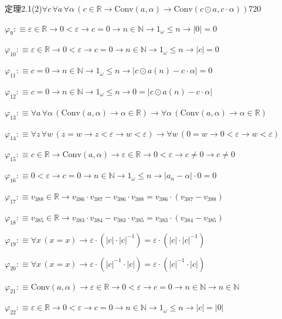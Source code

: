 \begin{fullproof}{定理2.1(2)}{$\forall c\,\forall a\,\forall \alpha\,(c \in \mathbb{R} \to \mathrm{Conv}(a,\alpha) \to \mathrm{Conv}(c \odot a,c \cdot \alpha))$}{720}
\begin{abbrevlist}
\item $\varphi_{9} :\equiv \varepsilon \in \mathbb{R} \to 0 < \varepsilon \to c = 0 \to n \in \mathbb{N} \to 1_{\omega} \leq n \to \lvert 0 \rvert = 0$
\item $\varphi_{10} :\equiv \varepsilon \in \mathbb{R} \to 0 < \varepsilon \to c = 0 \to n \in \mathbb{N} \to 1_{\omega} \leq n \to \lvert c \rvert = 0$
\item $\varphi_{11} :\equiv c = 0 \to n \in \mathbb{N} \to 1_{\omega} \leq n \to \lvert c \odot a(n) - c \cdot \alpha \rvert = 0$
\item $\varphi_{12} :\equiv c = 0 \to n \in \mathbb{N} \to 1_{\omega} \leq n \to 0 = \lvert c \odot a(n) - c \cdot \alpha \rvert$
\item $\varphi_{13} :\equiv \forall a\,\forall \alpha\,(\mathrm{Conv}(a,\alpha) \to \alpha \in \mathbb{R}) \to \forall \alpha\,(\mathrm{Conv}(a,\alpha) \to \alpha \in \mathbb{R})$
\item $\varphi_{14} :\equiv \forall z\,\forall w\,(z = w \to z < \varepsilon \to w < \varepsilon) \to \forall w\,(0 = w \to 0 < \varepsilon \to w < \varepsilon)$
\item $\varphi_{15} :\equiv c \in \mathbb{R} \to \mathrm{Conv}(a,\alpha) \to \varepsilon \in \mathbb{R} \to 0 < \varepsilon \to c \neq 0 \to c \neq 0$
\item $\varphi_{16} :\equiv 0 < \varepsilon \to c = 0 \to n \in \mathbb{N} \to 1_{\omega} \leq n \to \lvert a_{n} - \alpha \rvert \cdot 0 = 0$
\item $\varphi_{17} :\equiv v_{388} \in \mathbb{R} \to v_{386} \cdot v_{387} - v_{386} \cdot v_{388} = v_{386} \cdot (v_{387} - v_{388})$
\item $\varphi_{18} :\equiv v_{385} \in \mathbb{R} \to v_{383} \cdot v_{384} - v_{383} \cdot v_{385} = v_{383} \cdot (v_{384} - v_{385})$
\item $\varphi_{19} :\equiv \forall x\,(x = x) \to \varepsilon \cdot (\lvert c \rvert \cdot \lvert c \rvert^{-1}) = \varepsilon \cdot (\lvert c \rvert \cdot \lvert c \rvert^{-1})$
\item $\varphi_{20} :\equiv \forall x\,(x = x) \to \varepsilon \cdot (\lvert c \rvert^{-1} \cdot \lvert c \rvert) = \varepsilon \cdot (\lvert c \rvert^{-1} \cdot \lvert c \rvert)$
\item $\varphi_{21} :\equiv \mathrm{Conv}(a,\alpha) \to \varepsilon \in \mathbb{R} \to 0 < \varepsilon \to c = 0 \to n \in \mathbb{N} \to n \in \mathbb{N}$
\item $\varphi_{22} :\equiv \varepsilon \in \mathbb{R} \to 0 < \varepsilon \to c = 0 \to n \in \mathbb{N} \to 1_{\omega} \leq n \to \lvert c \rvert = \lvert 0 \rvert$

\end{abbrevlist}
\end{fullproof}
